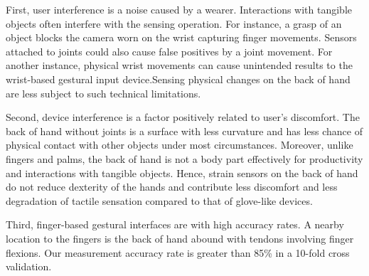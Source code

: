 \documentclass{sigchi}
\begin{document}
First, user interference is a noise caused by a wearer. Interactions with tangible objects often interfere with the sensing operation.
For instance, a grasp of an object blocks the camera worn on the wrist capturing finger movements.
Sensors attached to joints could also cause false positives by a joint movement.
For another instance, physical wrist movements can cause unintended results to the wrist-based gestural input device.Sensing physical changes on the back of hand are less subject to such technical limitations. 

Second, device interference is a factor positively related to user's discomfort. The back of hand without joints is a surface with less curvature and has less chance of physical contact with other objects under most circumstances. Moreover, unlike fingers and palms, the back of hand is not a body part effectively for productivity and interactions with tangible objects. Hence, strain sensors on the back of hand do not reduce dexterity of the hands and contribute less discomfort and less degradation of tactile sensation compared to that of glove-like devices.

Third, finger-based gestural interfaces are with high accuracy rates. A nearby location to the fingers is the back of hand abound with tendons involving finger flexions. Our measurement accuracy rate is greater than 85\% in a 10-fold cross validation.

 



\end{document}
